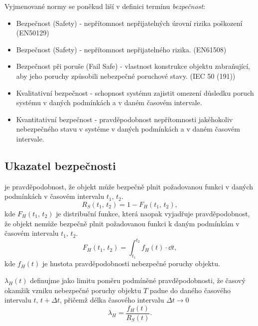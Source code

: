 {      Vyjmenované normy se poněkud liší v definici termínu \emph{bezpečnost}:  
      \begin{itemize}
        \item Bezpečnost (Safety) - nepřítomnost nepřijatelných úrovní rizika poškození (EN50129)
        \item Bezpečnost (Safety) - nepřítomnost nepřijatelného rizika. (EN61508)
        \item Bezpečnost při poruše (Fail Safe) - vlastnost konstrukce objektu zabraňující,
              aby jeho poruchy způsobili nebezpečné poruchové stavy. (IEC 50 (191))
        \item Kvalitativní bezpečnost - schopnost systému zajistit omezení důsledku poruch
              systému v daných podmínkách a v daném časovém intervale.
        \item Kvantitativní bezpečnost - pravděpodobnost nepřítomnosti jakéhokoliv
              nebezpečného stavu v systéme v daných podmínkách a v daném časovém intervale.
      \end{itemize}

    \subsection{Ukazatel bezpečnosti}
       je pravděpodobnost, že objekt může bezpečně plnit 
      požadovanou funkci v daných podmínkách v časovém intervalu \(t_1,\, t_2\).
      \begin{equation}
        R_S(t_1,\, t_2) = 1- F_H(t_1,\, t_2),
      \end{equation}
      kde \(F_H(t_1,\, t_2)\) je distribuční funkce, která naopak vyjadřuje pravděpodobnost, že
      objekt nemůže bezpečně plnit požadovanou funkci k daným podmínkám v časovém intervalu
      \(t_1,\, t_2\).
      \begin{equation}
        F_H(t_1,\, t_2) = \int_{t_1}^{t_2}f_H(t)\cdot\dd{t},
      \end{equation}
      kde \(f_H(t)\) je hustota pravděpodobnosti nebezpečné poruchy objektu. 

       \(\lambda_H(t)\) definujme jako limitu poměru podmíněné
      pravděpodobnosti, že časový okamžik vzniku nebezpečné poruchy objektu \(T\) padne do daného
      časového intervalu \(t,\, t+\Delta t\), přičemž délka časového intervalu \(\Delta
      t\rightarrow0\)
      \begin{equation}\label{DZT:eq_def_lambdaH}
        \lambda_H=\frac{f_H(t)}{R_S(t)}.
      \end{equation}

}
